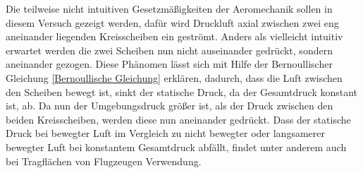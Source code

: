 Die teilweise nicht intuitiven Gesetzmäßigkeiten der Aeromechanik sollen in diesem Versuch gezeigt werden, dafür wird Druckluft axial zwischen zwei eng aneinander liegenden Kreisscheiben ein geströmt. Anders als vielleicht intuitiv erwartet werden die zwei Scheiben nun nicht auseinander gedrückt, sondern aneinander gezogen. Diese Phänomen lässt sich mit Hilfe der Bernoullischer Gleichung \ref{Bernoullische Gleichung} erklären, dadurch, dass die Luft zwischen den Scheiben bewegt ist, sinkt der statische Druck, da der Gesamtdruck konstant ist, ab. Da nun der Umgebungsdruck größer ist, als der Druck zwischen den beiden Kreisscheiben, werden diese nun aneinander gedrückt. Dass der statische Druck bei bewegter Luft im Vergleich zu nicht bewegter oder langsamerer bewegter Luft bei konstantem Gesamtdruck abfällt, findet unter anderem auch bei Tragflächen von Flugzeugen Verwendung.